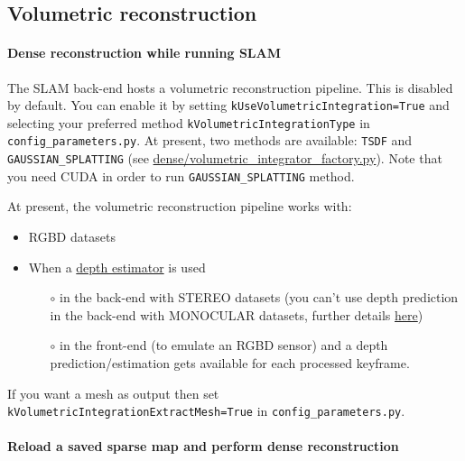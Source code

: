 \documentclass{article}
\let\oldparagraph\paragraph
\renewcommand{\paragraph}[1]{\oldparagraph{#1}\mbox{}}
\begin{document}
\hypertarget{volumetric-reconstruction}{%
\subsection{Volumetric reconstruction}\label{volumetric-reconstruction}}

\hypertarget{dense-reconstruction-while-running-slam}{%
\paragraph{Dense reconstruction while running
SLAM}\label{dense-reconstruction-while-running-slam}}

The SLAM back-end hosts a volumetric reconstruction pipeline. This is
disabled by default. You can enable it by setting
\texttt{kUseVolumetricIntegration=True} and selecting your preferred
method \texttt{kVolumetricIntegrationType} in
\texttt{config\_parameters.py}. At present, two methods are available:
\texttt{TSDF} and \texttt{GAUSSIAN\_SPLATTING} (see
\url{dense/volumetric_integrator_factory.py}). Note that you need CUDA
in order to run \texttt{GAUSSIAN\_SPLATTING} method.

At present, the volumetric reconstruction pipeline works with:
\begin{itemize}
\item RGBD datasets 
\item When a \protect\hyperlink{depth-prediction}{depth estimator}
is used
\begin{itemize}
\item[$\circ$] in the back-end with STEREO datasets (you can't use depth
prediction in the back-end with MONOCULAR datasets, further details
\protect\hyperlink{depth-prediction}{here}) 
\item[$\circ$] in the front-end (to emulate an RGBD sensor) and a depth prediction/estimation gets available
for each processed keyframe.
\end{itemize}
\end{itemize}

If you want a mesh as output then set
\texttt{kVolumetricIntegrationExtractMesh=True} in
\texttt{config\_parameters.py}.

\hypertarget{reload-a-saved-sparse-map-and-perform-dense-reconstruction}{%
\paragraph{Reload a saved sparse map and perform dense
reconstruction}\label{reload-a-saved-sparse-map-and-perform-dense-reconstruction}}
\end{document}

